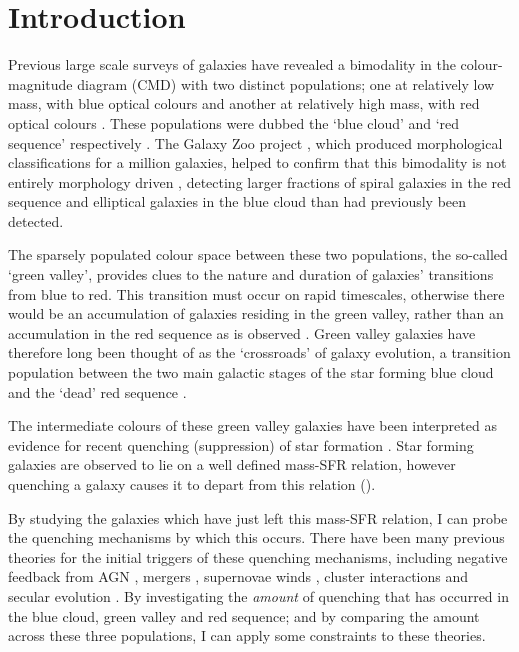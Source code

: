 \chapter{Introduction}

Previous large scale surveys of galaxies have revealed a bimodality in the colour-magnitude diagram (CMD) with two distinct populations; one at relatively low mass, with blue optical colours and another at relatively high mass, with red optical colours \citep{Baldry04, Baldry06, Willmer06, BLB08, Brammer09}. These populations were dubbed the `blue cloud' and `red sequence' respectively \citep{Chester64, BLE92, Driver06, Faber07}. The Galaxy Zoo project \citep{Lintott11}, which produced morphological classifications for a million galaxies, helped to confirm that this bimodality is not entirely morphology driven \citep{Strat01, Salim07, Sch07, CHV08, Bamford09, Skibba09}, detecting larger fractions of spiral galaxies in the red sequence \citep{Masters10} and elliptical galaxies in the blue cloud \citep{Sch09} than had previously been detected.

The sparsely populated colour space between these two populations, the so-called `green valley', provides clues to the nature and duration of galaxies' transitions from blue to red. This transition must occur on rapid timescales, otherwise there would be an accumulation of galaxies residing in the green valley, rather than an accumulation in the red sequence as is observed \citep{Arnouts07, Martin07}. Green valley galaxies have therefore long been thought of as the `crossroads' of galaxy evolution, a transition population between the two main galactic stages of the star forming blue cloud and the `dead' red sequence \citep{Bell04, Wyder07, Schim07, Martin07, Faber07, Mendez11, Gonc12, Sch2014, Pan14}. 


The intermediate colours of these green valley galaxies have been interpreted as evidence for recent quenching (suppression) of star formation \citep{Salim07}. Star forming galaxies are observed to lie on a well defined mass-SFR relation, however quenching a galaxy causes it to depart from this relation (\citealt{Noeske07, Peng}).


By studying the galaxies which  have just left this mass-SFR relation, I can probe the quenching mechanisms by which this occurs. There have been many previous theories for the initial triggers of these quenching mechanisms, including negative feedback from AGN \citep{diMatteo05, Martin07, Nandra07, Sch07}, mergers \citep{Darg10a, Cheung12, Barro13}, supernovae winds \citep{MFB12}, cluster interactions \citep{Coil08, Mendez11, Fang13} and secular evolution \citep{Masters10, Masters11, Mendez11}. By investigating the \emph{amount} of quenching that has occurred in the blue cloud, green valley and red sequence; and by comparing the amount across these three populations, I can apply some constraints to these theories. 


